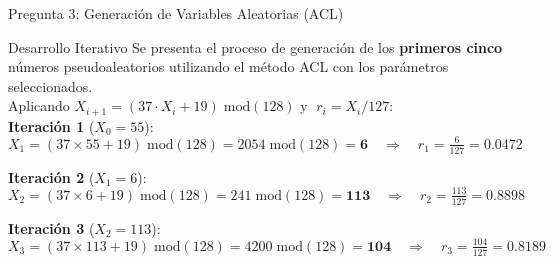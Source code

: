 \documentclass[aspectratio=169, 10pt]{beamer}
\begin{document}
\begin{frame}{Pregunta 3: Generación de Variables Aleatorias (ACL)}
	\begin{exampleblock}{Desarrollo Iterativo}
		\justifying
		Se presenta el proceso de generación de los \textbf{primeros cinco} números
		pseudoaleatorios utilizando el método ACL con los parámetros seleccionados.\\[6pt]
		Aplicando $X_{i+1} = (37 \cdot X_i + 19)\;\mathrm{mod}(128)$
		y $\;r_i = X_i/127$:\\[8pt]
		\textbf{Iteración 1} \;($X_0 = 55$):
		\[
			X_1 = (37 \times 55 + 19)\;\mathrm{mod}(128)
			= 2054\;\mathrm{mod}(128) = \mathbf{6}
			\quad\Rightarrow\quad r_1 = \tfrac{6}{127} = \mathbf{0.0472}
		\]

		\vspace{0.2em}
		\textbf{Iteración 2} \;($X_1 = 6$):
		\[
			X_2 = (37 \times 6 + 19)\;\mathrm{mod}(128)
			= 241\;\mathrm{mod}(128) = \mathbf{113}
			\quad\Rightarrow\quad r_2 = \tfrac{113}{127} = \mathbf{0.8898}
		\]

		\vspace{0.2em}
		\textbf{Iteración 3} \;($X_2 = 113$):
		\[
			X_3 = (37 \times 113 + 19)\;\mathrm{mod}(128)
			= 4200\;\mathrm{mod}(128) = \mathbf{104}
			\quad\Rightarrow\quad r_3 = \tfrac{104}{127} = \mathbf{0.8189}
		\]
		\vspace{-16pt}
	\end{exampleblock}

\end{frame}
\end{document}
